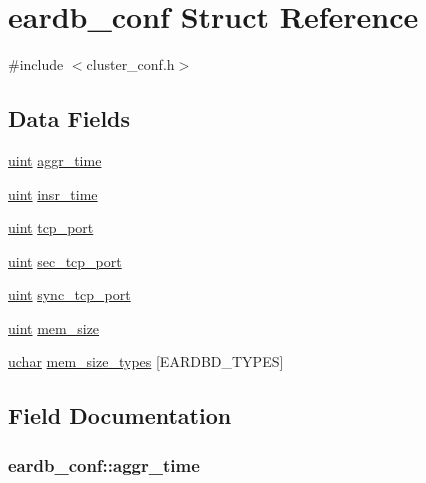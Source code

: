 \hypertarget{structeardb__conf}{}\section{eardb\+\_\+conf Struct Reference}
\label{structeardb__conf}


{\ttfamily \#include $<$cluster\+\_\+conf.\+h$>$}

\subsection*{Data Fields}
\begin{DoxyCompactItemize}
\item 
\hyperlink{generic_8h_a91ad9478d81a7aaf2593e8d9c3d06a14}{uint} \hyperlink{structeardb__conf_aa80651833b6a2594f3c767798b36a899}{aggr\+\_\+time}
\item 
\hyperlink{generic_8h_a91ad9478d81a7aaf2593e8d9c3d06a14}{uint} \hyperlink{structeardb__conf_abd34c6007df2cae4da6bdfa64de7275c}{insr\+\_\+time}
\item 
\hyperlink{generic_8h_a91ad9478d81a7aaf2593e8d9c3d06a14}{uint} \hyperlink{structeardb__conf_af4823cf78232f931cc656abcaa419422}{tcp\+\_\+port}
\item 
\hyperlink{generic_8h_a91ad9478d81a7aaf2593e8d9c3d06a14}{uint} \hyperlink{structeardb__conf_af6eb406a5d19cda103fe4b86cd80c330}{sec\+\_\+tcp\+\_\+port}
\item 
\hyperlink{generic_8h_a91ad9478d81a7aaf2593e8d9c3d06a14}{uint} \hyperlink{structeardb__conf_a0095734eaf046566c32410266470faa2}{sync\+\_\+tcp\+\_\+port}
\item 
\hyperlink{generic_8h_a91ad9478d81a7aaf2593e8d9c3d06a14}{uint} \hyperlink{structeardb__conf_a048bac7d19616d2c3e60325f18c12afa}{mem\+\_\+size}
\item 
\hyperlink{generic_8h_a65f85814a8290f9797005d3b28e7e5fc}{uchar} \hyperlink{structeardb__conf_ad0f1527436b5423d7613523da722aeaf}{mem\+\_\+size\+\_\+types} \mbox{[}E\+A\+R\+D\+B\+D\+\_\+\+T\+Y\+P\+ES\mbox{]}
\end{DoxyCompactItemize}


\subsection{Field Documentation}
\subsubsection[{\texorpdfstring{aggr\+\_\+time}{aggr_time}}]{ eardb\+\_\+conf\+::aggr\+\_\+time}\hypertarget{structeardb__conf_aa80651833b6a2594f3c767798b36a899}{}\label{structeardb__conf_aa80651833b6a2594f3c767798b36a899}
